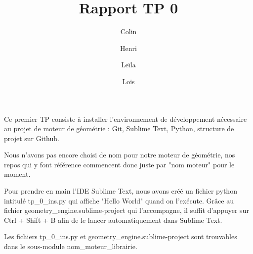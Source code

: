 \documentclass[a4 paper, 12pt]{article}
\title{Rapport TP 0}
\author{Colin \and Henri \and Leïla \and Loïs}
\date{}
\begin{document}
\maketitle

Ce premier TP consiste à installer l'environnement de développement nécessaire au projet de moteur de géométrie : Git, Sublime Text, Python, structure de projet sur Github.

Nous n'avons pas encore choisi de nom pour notre moteur de géométrie, nos repos qui y font référence commencent donc juste par "nom moteur" pour le moment.

Pour prendre en main l'IDE Sublime Text, nous avons créé un fichier python intitulé tp\_0\_ins.py qui affiche "Hello World" quand on l'exécute. Grâce au fichier geometry\_engine.sublime-project qui l'accompagne, il suffit d'appuyer sur Ctrl + Shift + B afin de le lancer automatiquement dans Sublime Text.

Les fichiers tp\_0\_ins.py et geometry\_engine.sublime-project sont trouvables dans le sous-module nom\_moteur\_librairie.
\end{document}
